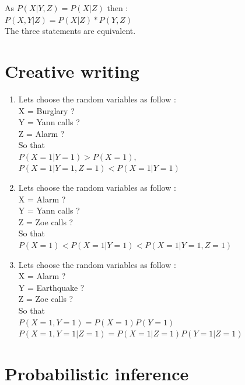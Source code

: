 \documentclass[]{article}
\begin{document}
As $P(X|Y,Z) = P(X|Z)$ then : \\

$P(X,Y|Z) = P(X|Z) * P(Y,Z)$ \\

The three statements are equivalent.

\newpage

\section{Creative writing}

\begin{enumerate}
  \item Lets choose the random variables as follow : \\

  X = Burglary ? \\
  Y = Yann calls ? \\
  Z = Alarm ? \\

  So that \\
  $P(X =1|Y =1) > P(X =1),$ \\
  $P(X =1|Y =1, Z =1) < P(X =1|Y =1)$

  \item Lets choose the random variables as follow : \\

  X = Alarm ? \\
  Y = Yann calls ? \\
  Z = Zoe calls ? \\

  So that \\
  $P(X =1) < P(X =1|Y =1) < P(X =1|Y =1, Z =1)$

  \item Lets choose the random variables as follow : \\

  X = Alarm ? \\
  Y = Earthquake ? \\
  Z = Zoe calls ? \\

  So that \\
  $P(X =1, Y =1) = P(X =1)P(Y =1)$ \\
  $P(X =1, Y =1|Z =1) = P(X =1|Z =1)P(Y =1|Z =1)$
\end{enumerate}

\newpage

\section{Probabilistic inference}
\end{document}

